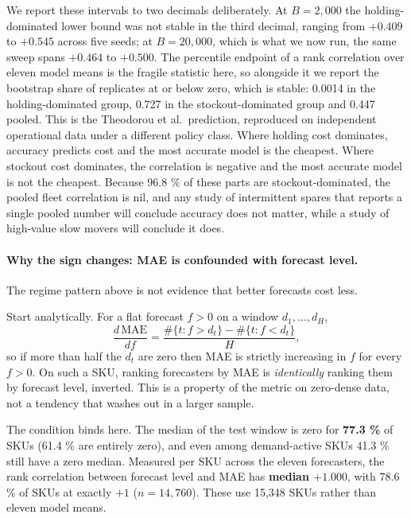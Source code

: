 \documentclass[11pt]{article}
\begin{document}
We report these intervals to two decimals deliberately. At $B = 2{,}000$ the
holding-dominated lower bound was not stable in the third decimal, ranging from
$+0.409$ to $+0.545$ across five seeds; at $B = 20{,}000$, which is what we now
run, the same sweep spans $+0.464$ to $+0.500$. The percentile endpoint of a
rank correlation over eleven model means is the fragile statistic here, so
alongside it we report the bootstrap share of replicates at or below zero, which
is stable: 0.0014 in the holding-dominated group, 0.727 in the
stockout-dominated group and 0.447 pooled. This is the Theodorou et
al.\ prediction, reproduced on independent operational data under a different
policy class. Where holding cost dominates, accuracy predicts cost and the most
accurate model is the cheapest. Where stockout cost dominates, the correlation
is negative and the most accurate model is not the cheapest. Because 96.8 \% of
these parts are stockout-dominated, the pooled fleet correlation is nil, and
any study of intermittent spares that reports a single pooled number will
conclude accuracy does not matter, while a study of high-value slow movers will
conclude it does.

\paragraph{Why the sign changes: MAE is confounded with forecast level.} The
regime pattern above is not evidence that better forecasts cost less.

Start analytically. For a flat forecast $f > 0$ on a window $d_1,\dots,d_H$,
\begin{equation*}
\frac{d\,\mathrm{MAE}}{df}
= \frac{ \#\{t : f > d_t\} - \#\{t : f < d_t\} }{H},
\end{equation*}
so if more than half the $d_t$ are zero then MAE is strictly increasing in $f$
for every $f > 0$. On such a SKU, ranking forecasters by MAE is
\emph{identically} ranking them by forecast level, inverted. This is a property
of the metric on zero-dense data, not a tendency that washes out in a larger
sample.

The condition binds here. The median of the test window is zero for
\textbf{77.3 \%} of SKUs (61.4 \% are entirely zero), and even among
demand-active SKUs 41.3 \% still have a zero median. Measured per SKU across
the eleven forecasters, the rank correlation between forecast level and MAE has
\textbf{median $+1.000$}, with 78.6 \% of SKUs at exactly $+1$
($n = 14{,}760$). These use 15{,}348 SKUs rather than eleven model means.
\end{document}
